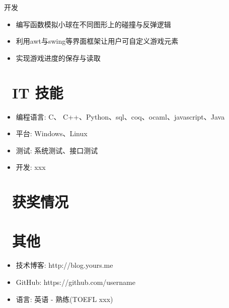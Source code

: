 \documentclass{resume}
\begin{document}
开发
\begin{itemize}
  \item 编写函数模拟小球在不同图形上的碰撞与反弹逻辑
  \item 利用awt与swing等界面框架让用户可自定义游戏元素
  \item 实现游戏进度的保存与读取
\end{itemize}







\section{\faCogs\ IT 技能}
\begin{itemize}[parsep=0.5ex]
  \item 编程语言: C、 C++、Python、sql、coq、ocaml、javascript、Java
  \item 平台: Windows、Linux
  \item 测试: 系统测试、接口测试
  \item 开发: xxx
\end{itemize}

\section{\faHeartO\ 获奖情况}


\section{\faInfo\ 其他}
\begin{itemize}[parsep=0.5ex]
  \item 技术博客: http://blog.yours.me
  \item GitHub: https://github.com/username
  \item 语言: 英语 - 熟练(TOEFL xxx)
\end{itemize}

%
%
\end{document}
